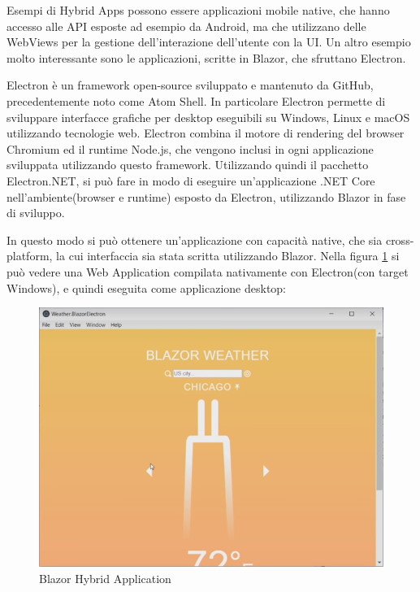 Esempi di Hybrid Apps possono essere applicazioni mobile native, che hanno accesso alle API esposte ad esempio da Android, ma che utilizzano delle WebViews per la gestione dell'interazione dell'utente con la UI.
Un altro esempio molto interessante sono le applicazioni, scritte in Blazor, che sfruttano Electron.

Electron \`e un framework open-source sviluppato e mantenuto da GitHub, precedentemente noto come Atom Shell.
In particolare Electron permette di sviluppare interfacce grafiche per desktop eseguibili su Windows, Linux e macOS utilizzando tecnologie web\cite{electronWiki}.
Electron combina il motore di rendering del browser Chromium ed il runtime Node.js, che vengono inclusi in ogni applicazione sviluppata utilizzando questo framework.
Utilizzando quindi il pacchetto Electron.NET, si pu\`o fare in modo di eseguire un'applicazione .NET Core nell'ambiente(browser e runtime) esposto da Electron, utilizzando Blazor in fase di sviluppo\cite{electronDotNet}.

In questo modo si pu\`o ottenere un'applicazione con capacit\`a native, che sia cross-platform, la cui interfaccia sia stata scritta utilizzando Blazor.
Nella figura \ref{fig:BlazorHybridApplication} si pu\`o vedere una Web Application compilata nativamente con Electron(con target Windows), e quindi eseguita come applicazione desktop:

\begin{figure}[H]
	\centerline{\includegraphics[scale=0.6]{figure/BlazorWeatherElectron.png}}
	\caption{Blazor Hybrid Application}
	\label{fig:BlazorHybridApplication}
\end{figure}

